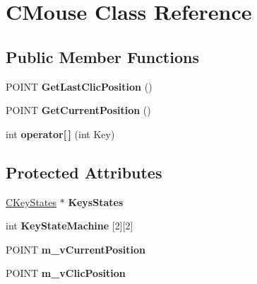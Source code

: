 \hypertarget{class_c_mouse}{}\section{C\+Mouse Class Reference}
\label{class_c_mouse}
\subsection*{Public Member Functions}
\begin{DoxyCompactItemize}
\item 
P\+O\+I\+NT {\bfseries Get\+Last\+Clic\+Position} ()\hypertarget{class_c_mouse_ac47356a151995707b18bd7098bd4d230}{}\label{class_c_mouse_ac47356a151995707b18bd7098bd4d230}

\item 
P\+O\+I\+NT {\bfseries Get\+Current\+Position} ()\hypertarget{class_c_mouse_aa13bb1c532752c4e2445e2e3728b8a37}{}\label{class_c_mouse_aa13bb1c532752c4e2445e2e3728b8a37}

\item 
int {\bfseries operator\mbox{[}$\,$\mbox{]}} (int Key)\hypertarget{class_c_mouse_ac10071f793009745292e57b656da207e}{}\label{class_c_mouse_ac10071f793009745292e57b656da207e}

\end{DoxyCompactItemize}
\subsection*{Protected Attributes}
\begin{DoxyCompactItemize}
\item 
\hyperlink{class_c_key_states}{C\+Key\+States} $\ast$ {\bfseries Keys\+States}\hypertarget{class_c_mouse_ae951ad1e0c5b35a45f9fd2f0415db70a}{}\label{class_c_mouse_ae951ad1e0c5b35a45f9fd2f0415db70a}

\item 
int {\bfseries Key\+State\+Machine} \mbox{[}2\mbox{]}\mbox{[}2\mbox{]}\hypertarget{class_c_mouse_a2f0455121ec55376ff27dfde56f656c5}{}\label{class_c_mouse_a2f0455121ec55376ff27dfde56f656c5}

\item 
P\+O\+I\+NT {\bfseries m\+\_\+v\+Current\+Position}\hypertarget{class_c_mouse_a6d0204c9179a2327b0fb08e588bd1f80}{}\label{class_c_mouse_a6d0204c9179a2327b0fb08e588bd1f80}

\item 
P\+O\+I\+NT {\bfseries m\+\_\+v\+Clic\+Position}\hypertarget{class_c_mouse_acb7cdb04f867b3b0c1b1aba31c7ea949}{}\label{class_c_mouse_acb7cdb04f867b3b0c1b1aba31c7ea949}

\end{DoxyCompactItemize}
